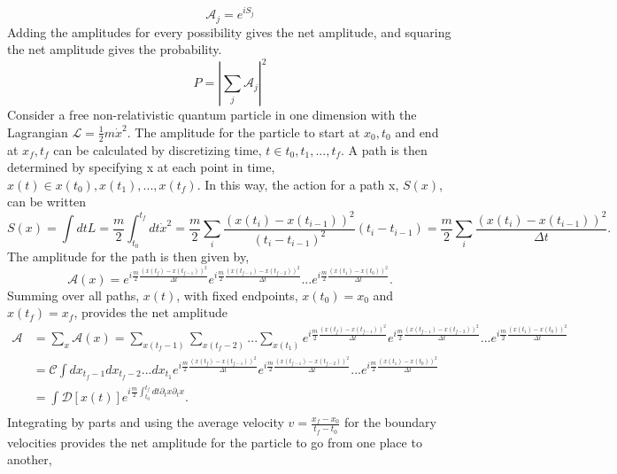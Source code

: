 \begin{equation}
\mathcal{A}_j = e^{iS_{j}} 
\end{equation}
Adding the amplitudes for every possibility gives the net amplitude, and squaring the net amplitude gives the probability.   
\begin{equation}
P = |\sum_j \mathcal{A}_j|^2
\end{equation}
Consider a free non-relativistic quantum particle in one dimension with the Lagrangian $\mathcal{L} = \frac{1}{2}m\dot{x}^2$. The amplitude for the particle to start at $x_0, t_0$ and end at $x_f, t_f$ can be calculated by discretizing time, $t \in {t_0, t_1, ..., t_f}$. A path is then determined by specifying x at each point in time, $x(t) \in {x(t_0), x(t_1), ..., x(t_f)}$. In this way, the action for a path x, $S(x)$, can be written
\begin{equation}
S(x) = \int dt L = \frac{m}{2} \int_{t_0}^{t_f} dt \dot{x}^2 = \frac{m}{2} \sum_i \frac{(x(t_i) - x(t_{i-1}))^2}{(t_i - t_{i-1})^2} (t_i - t_{i-1})  
= \frac{m}{2} \sum_i \frac{(x(t_i) - x(t_{i-1}))^2}{\Delta t}.
\end{equation}
The amplitude for the path is then given by, 
\begin{equation}
\mathcal{A}(x) = e^{i\frac{m}{2}\frac{(x(t_f) - x(t_{f-1}))^2}{\Delta t}}e^{i\frac{m}{2}\frac{(x(t_{f-1}) - x(t_{f-2}))^2}{\Delta t}}...e^{i\frac{m}{2}\frac{(x(t_1) - x(t_{0}))^2}{\Delta t}}.
\end{equation}
Summing over all paths, $x(t)$, with fixed endpoints, $x(t_0) = x_0$ and $x(t_f) = x_f$, provides the net amplitude 
\begin{equation}
\begin{split}
\mathcal{A} &= \sum_{x} \mathcal{A}(x) = \sum_{x(t_f-1)} \sum_{x(t_f-2)} ... \sum_{x(t_1)} 
e^{i\frac{m}{2}\frac{(x(t_f) - x(t_{f-1}))^2}{\Delta t}}e^{i\frac{m}{2}\frac{(x(t_{f-1}) - x(t_{f-2}))^2}{\Delta t}}...
e^{i\frac{m}{2}\frac{(x(t_1) - x(t_{0}))^2}{\Delta t}} \\
&= \mathcal{C} \int dx_{t_f-1}dx_{t_f-2}...dx_{t_1} 
e^{i\frac{m}{2}\frac{(x(t_f) - x(t_{f-1}))^2}{\Delta t}}e^{i\frac{m}{2}\frac{(x(t_{f-1}) - x(t_{f-2}))^2}{\Delta t}}...
e^{i\frac{m}{2}\frac{(x(t_1) - x(t_{0}))^2}{\Delta t}}\\
& = \int \mathcal{D}[x(t)] e^{i\frac{m}{2}\int_{t_0}^{t_f} dt \partial_t x \partial_t x}.\\
\end{split}
\end{equation} 
Integrating by parts and using the average velocity $v = \frac{x_f-x_0}{t_f - t_0}$ for the boundary velocities provides the net amplitude for the particle to go from one place to another,
